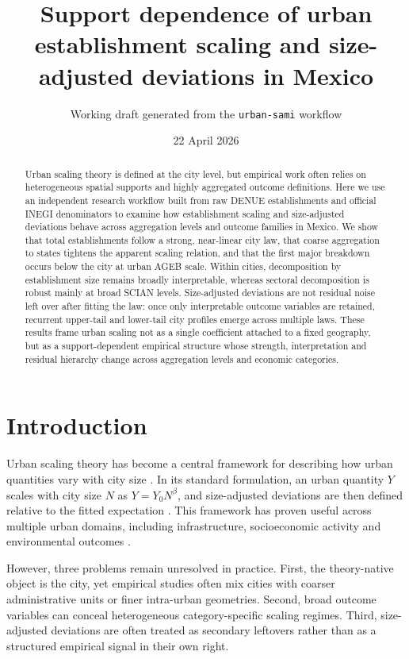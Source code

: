 \documentclass[11pt]{article}
\title{\textbf{Support dependence of urban establishment scaling and size-adjusted deviations in Mexico}}
\author{Working draft generated from the \texttt{urban-sami} workflow}
\date{22 April 2026}
\begin{document}
\maketitle

\begin{abstract}
Urban scaling theory is defined at the city level, but empirical work often relies on heterogeneous spatial supports and highly aggregated outcome definitions. Here we use an independent research workflow built from raw DENUE establishments and official INEGI denominators to examine how establishment scaling and size-adjusted deviations behave across aggregation levels and outcome families in Mexico. We show that total establishments follow a strong, near-linear city law, that coarse aggregation to states tightens the apparent scaling relation, and that the first major breakdown occurs below the city at urban AGEB scale. Within cities, decomposition by establishment size remains broadly interpretable, whereas sectoral decomposition is robust mainly at broad SCIAN levels. Size-adjusted deviations are not residual noise left over after fitting the law: once only interpretable outcome variables are retained, recurrent upper-tail and lower-tail city profiles emerge across multiple laws. These results frame urban scaling not as a single coefficient attached to a fixed geography, but as a support-dependent empirical structure whose strength, interpretation and residual hierarchy change across aggregation levels and economic categories.
\end{abstract}

\section*{Introduction}
Urban scaling theory has become a central framework for describing how urban quantities vary with city size \citep{bettencourt2007growth,bettencourt2013origins,bettencourt2021ius}. In its standard formulation, an urban quantity $Y$ scales with city size $N$ as $Y = Y_0 N^\beta$, and size-adjusted deviations are then defined relative to the fitted expectation \citep{bettencourt2010urban}. This framework has proven useful across multiple urban domains, including infrastructure, socioeconomic activity and environmental outcomes \citep{lu2024waste}.

However, three problems remain unresolved in practice. First, the theory-native object is the city, yet empirical studies often mix cities with coarser administrative units or finer intra-urban geometries. Second, broad outcome variables can conceal heterogeneous category-specific scaling regimes. Third, size-adjusted deviations are often treated as secondary leftovers rather than as a structured empirical signal in their own right.
\end{document}
